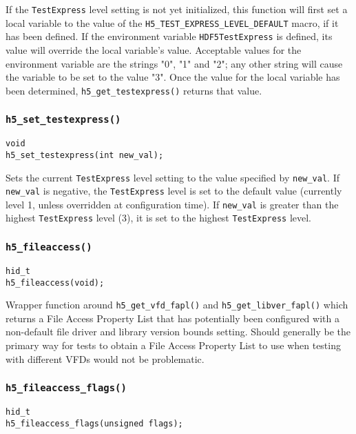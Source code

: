 \documentclass[../HDF5_RFC.tex]{subfiles}
\begin{document}
If the \texttt{TestExpress} level setting is not yet initialized, this function will first set a local variable to the value of the \texttt{H5\_TEST\_EXPRESS\_LEVEL\_DEFAULT} macro, if it has been defined.
If the environment variable \texttt{HDF5TestExpress} is defined, its value will override the local
variable's value. Acceptable values for the environment variable are the strings "0", "1" and "2"; any
other string will cause the variable to be set to the value "3". Once the value for the local variable
has been determined, \texttt{h5\_get\_testexpress()} returns that value.

\subsubsection{\texttt{h5\_set\_testexpress()}}

\begin{verbatim}
void
h5_set_testexpress(int new_val);
\end{verbatim}

Sets the current \texttt{TestExpress} level setting to the value specified by \texttt{new\_val}. If
\texttt{new\_val} is negative, the \texttt{TestExpress} level is set to the default value (currently
level 1, unless overridden at configuration time). If \texttt{new\_val} is greater than the highest
\texttt{TestExpress} level (3), it is set to the highest \texttt{TestExpress} level.

\subsubsection{\texttt{h5\_fileaccess()}}

\begin{verbatim}
hid_t
h5_fileaccess(void);
\end{verbatim}

Wrapper function around \texttt{h5\_get\_vfd\_fapl()} and \texttt{h5\_get\_libver\_fapl()} which returns
a File Access Property List that has potentially been configured with a non-default file driver and
library version bounds setting. Should generally be the primary way for tests to obtain a File Access
Property List to use when testing with different VFDs would not be problematic.

\subsubsection{\texttt{h5\_fileaccess\_flags()}}

\begin{verbatim}
hid_t
h5_fileaccess_flags(unsigned flags);
\end{verbatim}
\end{document}
